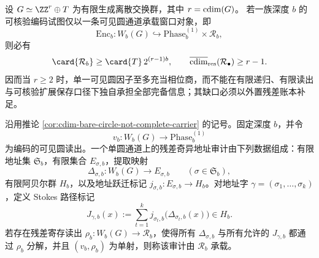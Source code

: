 \begin{corollary}[单一可见圆通道不是完备承载体]\label{cor:cdim-bare-circle-not-complete-carrier}
设 \(G\simeq \ZZ^{r}\oplus T\) 为有限生成离散交换群，其中 \(r=\operatorname{cdim}(G)\)。
若一族深度 \(b\) 的可核验编码试图仅以一条可见圆通道承载窗口对象，即
\[
\mathrm{Enc}_b:W_b(G)\hookrightarrow \mathrm{Phase}_b^{(1)}\times \mathcal{R}_b,
\]
则必有
\[
\card{\mathcal{R}_b}\ge \card{T}\,2^{(r-1)b},
\qquad
\overline{\cdim}_{\mathrm{res}}(\mathcal{R}_\bullet)\ge r-1.
\]
因而当 \(r\ge 2\) 时，单一可见圆因子至多充当相位商，而不能在有限递归、有限读出与可核验扩展保存口径下独自承担全部完备信息；其缺口必须以外置残差账本补足。
\end{corollary}
\begin{definition}[单圆通道的残差奇异地址审计]\label{def:distill-ecalle-bare-circle-residual-address-audit}
沿用推论 \ref{cor:cdim-bare-circle-not-complete-carrier} 的记号。固定深度 \(b\)，并令
\[
v_b:W_b(G)\longrightarrow \mathrm{Phase}_b^{(1)}
\]
为编码的可见圆读出。一个单圆通道上的残差奇异地址审计由下列数据组成：有限地址集
\(\mathfrak S_b\)，有限集合 \(E_{\sigma,b}\)，提取映射
\[
\Delta_{\sigma,b}:W_b(G)\longrightarrow E_{\sigma,b}
\qquad(\sigma\in\mathfrak S_b),
\]
有限阿贝尔群 \(H_b\)，以及地址跃迁标记
\(j_{\sigma,b}:E_{\sigma,b}\to H_b\)。对地址字
\(\gamma=(\sigma_1,\ldots,\sigma_k)\)，定义 Stokes 路径标记
\[
J_{\gamma,b}(x):=\sum_{t=1}^{k}j_{\sigma_t,b}\bigl(\Delta_{\sigma_t,b}(x)\bigr)\in H_b.
\]
若存在残差寄存读出 \(\rho_b:W_b(G)\to\mathcal R_b\)，使得所有
\(\Delta_{\sigma,b}\) 与所有允许的 \(J_{\gamma,b}\) 都通过 \(\rho_b\) 分解，并且
\((v_b,\rho_b)\) 为单射，则称该审计由 \(\mathcal R_b\) 承载。
\end{definition}

